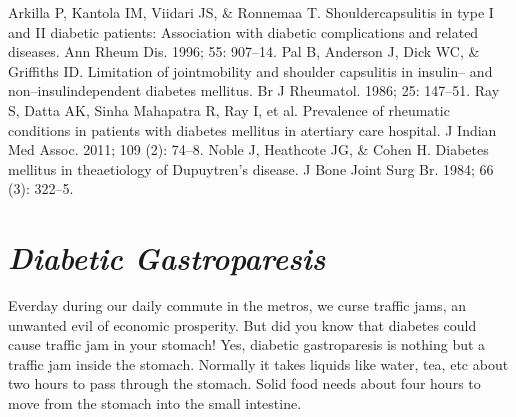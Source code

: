 \begin{thebibliography}{99}
 Arkilla P, Kantola IM, Viidari JS, \& Ronnemaa T. Shoulder\break capsulitis in type I and II diabetic patients: Association with dia\-betic complications and related diseases. Ann Rheum Dis. 1996; 55: 907–14.
 Pal B, Anderson J, Dick WC, \& Griffiths ID. Limitation of joint\break mobility and shoulder capsulitis in insulin– and non–insulin\break dependent diabetes mellitus. Br J Rheumatol. 1986; 25: 147–51.
 Ray S, Datta AK, Sinha Mahapatra R, Ray I, et al. Prevalence of rheumatic conditions in patients with diabetes mellitus in a\break tertiary care hospital. J Indian Med Assoc. 2011; 109 (2): 74–8.
 Noble J, Heathcote JG, \& Cohen H. Diabetes mellitus in the\break aetiology of Dupuytren’s disease. J Bone Joint Surg Br. 1984; 66 (3): 322–5.
\end{thebibliography}


\chapter{\textit{Diabetic Gastroparesis}}\label{chap20}

Everday during our daily commute in the metros, we curse traffic jams, an unwanted evil of economic prosperity. But did you know that diabetes could cause traffic jam in your stomach! Yes, diabetic gastroparesis is nothing but a traffic jam inside the stomach. Normally it takes liquids like water, tea, etc about two hours to pass through the stomach. Solid food needs about four hours to move from the stomach into the small intestine.

